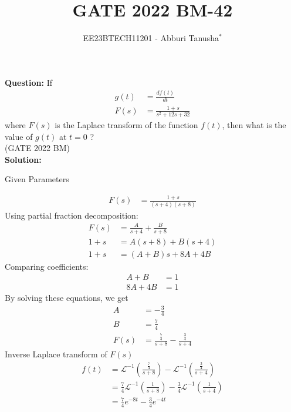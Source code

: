 \documentclass[journal,12pt,twocolumn]{IEEEtran}
\newcommand{\brak}[1]{\left( #1 \right)}
\theoremstyle{remark}
\begin{document}

\vspace{3cm}

\title{GATE 2022 BM-42}
\author{EE23BTECH11201 - Abburi Tanusha$^{*}$%
}
\maketitle
\newpage
\bigskip

\renewcommand{\thefigure}{\theenumi}
\renewcommand{\thetable}{\theenumi}

\vspace{3cm}

\maketitle
\textbf{Question:} 
If 
\begin{align}
 g(t) &= \frac{df(t)}{dt} \\
 F(s) &= \frac{1+s}{s^2+12s+32} 
\end{align} 
where $F(s)$ is the Laplace transform of the function $f(t)$, then what is the value of $g(t)$ at $t=0$ ?\\
\hfill(GATE 2022 BM)\\
\textbf{Solution:} 
\begin{table}[h!]
\centering
\resizebox{6cm}{!}{

}
\caption{Given Parameters}
\label{tab:tanu_tabel}
\end{table}
\begin{align}
F(s) &= \frac{1+s}{(s+4)(s+8)}
\end{align}
Using partial fraction decomposition:
\begin{align}
F(s) &= \frac{A}{s+4} + \frac{B}{s+8} \\
1+s &= A(s+8) + B(s+4) \\
1+s &= (A+B)s + 8A + 4B
\end{align}
Comparing coefficients:
\begin{align}
A+B &= 1 \\
8A + 4B &= 1
\end{align}
By solving these equations, we get
\begin{align}
A &= -\frac{3}{4} \\
B &= \frac{7}{4}  \\
F(s) &= \frac{\frac{7}{4}}{s+8} - \frac{\frac{3}{4}}{s+4} 
\end{align}
Inverse Laplace transform of $F(s)$ 
\begin{align}
f(t) &= \mathcal{L}^{-1}\brak{\frac{\frac{7}{4}}{s+8}} - \mathcal{L}^{-1}\brak{\frac{\frac{3}{4}}{s+4}} \\
&= \frac{7}{4}\mathcal{L}^{-1}\brak{\frac{1}{s+8}} - \frac{3}{4}\mathcal{L}^{-1}\brak{\frac{1}{s+4}} \\
&= \frac{7}{4}e^{-8t} - \frac{3}{4}e^{-4t}
\end{align}
\end{document}
